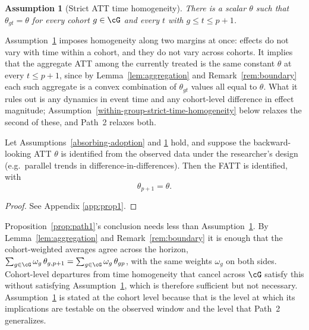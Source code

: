 \documentclass{article}
\newtheorem{assumption}{Assumption}
\begin{document}
\begin{assumption}[Strict ATT time homogeneity]\label{strict-time-homogeneity}
There is a scalar $\theta$ such that $\theta_{gt} = \theta$ for every cohort $g \in \cG$ and every $t$ with $g \leq t \leq p+1$.
\end{assumption}

Assumption~\ref{strict-time-homogeneity} imposes homogeneity along two margins at once: effects do not vary with time within a cohort, and they do not vary across cohorts. It implies that the aggregate ATT among the currently treated is the same constant $\theta$ at every $t \leq p+1$, since by Lemma~\ref{lem:aggregation} and Remark~\ref{rem:boundary} each such aggregate is a convex combination of $\theta_{gt}$ values all equal to $\theta$. What it rules out is any dynamics in event time and any cohort-level difference in effect magnitude; Assumption~\ref{within-group-strict-time-homogeneity} below relaxes the second of these, and Path~2 relaxes both.

\begin{proposition}\label{prop:path1}
Let Assumptions~\ref{absorbing-adoption} and \ref{strict-time-homogeneity} hold, and suppose the backward-looking ATT $\theta$ is identified from the observed data under the researcher's design (e.g.\ parallel trends in difference-in-differences). Then the FATT is identified, with
\[
\theta_{p+1} = \theta.
\]
\end{proposition}

\begin{proof}
See Appendix \ref{app:prop1}.
\end{proof}

\begin{remark}\label{rem:aggregate-homogeneity}
Proposition~\ref{prop:path1}'s conclusion needs less than Assumption~\ref{strict-time-homogeneity}. By Lemma~\ref{lem:aggregation} and Remark~\ref{rem:boundary} it is enough that the cohort-weighted averages agree across the horizon, $\sum_{g\in\cG}\omega_g\,\theta_{g,p+1} = \sum_{g\in\cG}\omega_g\,\theta_{gp}$, with the same weights $\omega_g$ on both sides. Cohort-level departures from time homogeneity that cancel across $\cG$ satisfy this without satisfying Assumption~\ref{strict-time-homogeneity}, which is therefore sufficient but not necessary. Assumption~\ref{strict-time-homogeneity} is stated at the cohort level because that is the level at which its implications are testable on the observed window and the level that Path~2 generalizes.
\end{remark}
\end{document}
